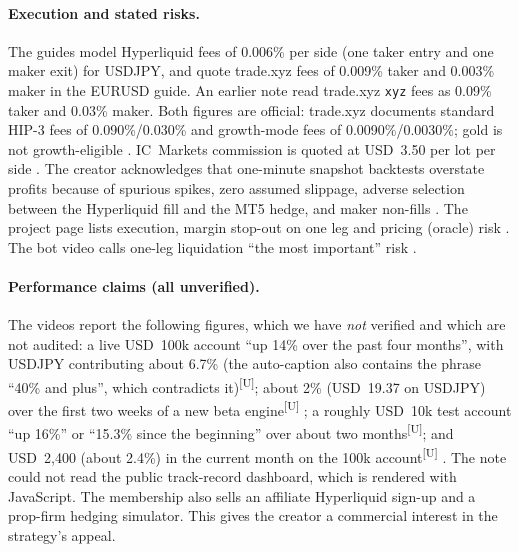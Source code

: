 \documentclass[11pt,a4paper]{article}
\newcommand{\unverified}{\textsuperscript{[U]}}
\begin{document}
\paragraph{Execution and stated risks.}
The guides model Hyperliquid fees of 0.006\% per side (one taker entry and one maker exit) for USDJPY, and quote trade.xyz fees of 0.009\% taker and 0.003\% maker in the EURUSD guide. An earlier note read trade.xyz \texttt{xyz} fees as 0.09\% taker and 0.03\% maker. Both figures are official: trade.xyz documents standard HIP-3 fees of 0.090\%/0.030\% and growth-mode fees of 0.0090\%/0.0030\%; gold is not growth-eligible \citep{tradexyz_fees}.
IC~Markets commission is quoted at USD~3.50 per lot per side \citep{atj_yt_eur}.
The creator acknowledges that one-minute snapshot backtests overstate profits because of spurious spikes, zero assumed slippage, adverse selection between the Hyperliquid fill and the MT5 hedge, and maker non-fills \citep{atj_yt_jpy}.
The project page lists execution, margin stop-out on one leg and pricing (oracle) risk \citep{atj_project}. The bot video calls one-leg liquidation ``the most important'' risk \citep{atj_yt_bot}.

\paragraph{Performance claims (all unverified).}
The videos report the following figures, which we have \emph{not} verified and which are not audited:
a live USD~100k account ``up 14\% over the past four months'', with USDJPY contributing about 6.7\% (the auto-caption also contains the phrase ``40\% and plus'', which contradicts it)\unverified{};
about 2\% (USD~19.37 on USDJPY) over the first two weeks of a new beta engine\unverified{} \citep{atj_yt_jpy};
a roughly USD~10k test account ``up 16\%'' or ``15.3\% since the beginning'' over about two months\unverified{};
and USD~2{,}400 (about 2.4\%) in the current month on the 100k account\unverified{} \citep{atj_yt_bot}.
The note could not read the public track-record dashboard, which is rendered with JavaScript.
The membership also sells an affiliate Hyperliquid sign-up and a prop-firm hedging simulator. This gives the creator a commercial interest in the strategy's appeal.
\end{document}

